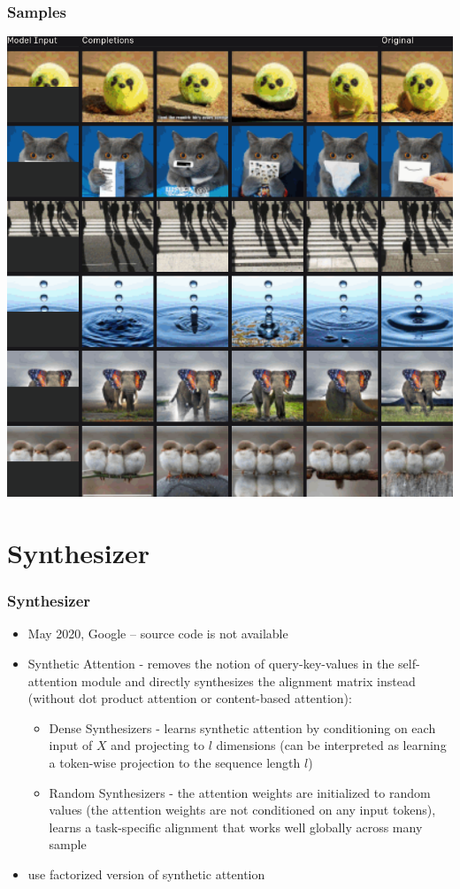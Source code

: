 \documentclass{beamer}
\begin{document}
\begin{frame}
    \frametitle{Samples}
    \begin{center}
        \includegraphics[scale=0.23]{img/igpt_samples.png}
    \end{center}
\end{frame}





\section{Synthesizer}
\begin{frame}
    \frametitle{Synthesizer \cite{synthesizer}}
    \begin{itemize}
        \item May 2020, Google -- source code is not available
        \item Synthetic Attention - removes the notion of query-key-values in the self-attention module and directly synthesizes the alignment matrix instead (without dot product attention or content-based attention):
        \begin{itemize}
            \item Dense Synthesizers - learns synthetic attention by conditioning on each input of $X$ and projecting to $l$ dimensions (can be interpreted as learning a token-wise projection to the sequence length $l$)
            \item Random Synthesizers - the attention weights are initialized to random values (the attention weights are not conditioned on any input tokens), learns a task-specific alignment that works well globally across many sample
        \end{itemize}
        \item use factorized version of synthetic attention
    \end{itemize}
\end{frame}
\end{document}
